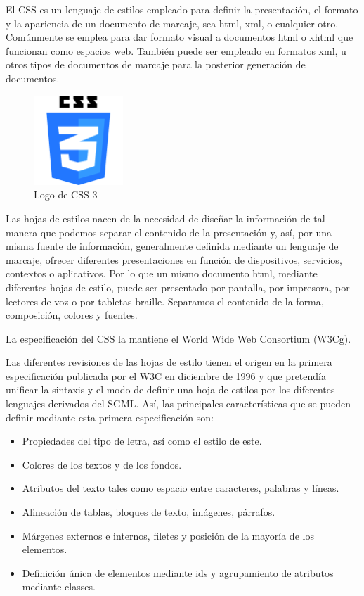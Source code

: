 El CSS es un lenguaje de estilos empleado para definir la presentación, el formato y la apariencia de un documento de marcaje, sea html, xml, o cualquier otro. Comúnmente se emplea para dar formato visual a documentos html o xhtml que funcionan como espacios web. También puede ser empleado en formatos xml, u otros tipos de documentos de marcaje para la posterior generación de documentos.

\begin{figure}[htb]
    \centering
    \includegraphics[width=0.3\textwidth]{imagenes/css3logo.png}
    \caption{Logo de CSS 3}
    \label{fig:logocss}
\end{figure}

Las hojas de estilos nacen de la necesidad de diseñar la información de tal manera que podemos separar el contenido de la presentación y, así, por una misma fuente de información, generalmente definida mediante un lenguaje de marcaje, ofrecer diferentes presentaciones en función de dispositivos, servicios, contextos o aplicativos. Por lo que un mismo documento html, mediante diferentes hojas de estilo, puede ser presentado por pantalla, por impresora, por lectores de voz o por tabletas braille. Separamos el contenido de la forma, composición, colores y fuentes.

La especificación del CSS la mantiene el World Wide Web Consortium (W3Cg).


Las diferentes revisiones de las hojas de estilo tienen el origen en la primera especificación publicada por el W3C en diciembre de 1996 y que pretendía unificar la sintaxis y el modo de definir una hoja de estilos por los diferentes lenguajes derivados del SGML. Así, las principales características que se pueden definir mediante esta primera especificación son:
\begin{itemize}
    \item Propiedades del tipo de letra, así como el estilo de este.
    \item Colores de los textos y de los fondos.
    \item Atributos del texto tales como espacio entre caracteres, palabras y líneas.
    \item Alineación de tablas, bloques de texto, imágenes, párrafos.
    \item Márgenes externos e internos, filetes y posición de la mayoría de los elementos.
    \item Definición única de elementos mediante ids y agrupamiento de atributos
    mediante classes.
\end{itemize}

